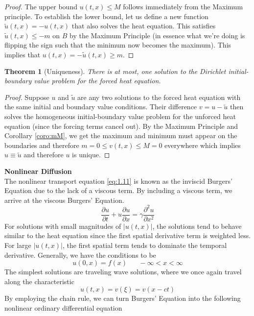 \documentclass{article}
\newcommand{\pd}[2]{\frac{\partial #1}{\partial #2}}
\newcommand{\pdt}[2]{\frac{\partial ^2 #1}{\partial #2 ^2}}
\newtheorem{theorem}{Theorem}[section]
\numberwithin{equation}{section}
\begin{document}
\begin{proof}
        The upper bound $u(t,x) \leq M$ follows immediately from the Maximum principle. To establish the lower bound, let us define a new function $\tilde{u}(t,x) = -u(t,x)$ that also solves the heat equation. This satisfies $\tilde{u}(t,x) \leq -m$ on $B$ by the Maximum Principle (in essence what we're doing is flipping the sign such that the minimum now becomes the maximum). This implies that $u(t,x) = -\tilde{u}(t,x) \geq m$.
    \end{proof}
\begin{theorem}[Uniqueness]
    There is at most, one solution to the Dirichlet initial-boundary value problem for the forced heat equation.
\end{theorem}
\begin{proof}
    Suppose $u$ and $\tilde{u}$ are any two solutions to the forced heat equation with the same initial and boundary value conditions. Their difference $v=u-\tilde{u}$ then solves the homogeneous initial-boundary value problem for the unforced heat equation (since the forcing terms cancel out). By the Maximum Principle and Corollary \ref{coro:mM}, we get the maximum and minimum must appear on the boundaries and therefore $m=0\leq v(t,x) \leq M=0$ everywhere which implies $u\equiv \tilde{u}$ and therefore $u$ is unique.
\end{proof}
\textbf{Nonlinear Diffusion} \\
The nonlinear transport equation \eqref{eq:1.11} is known as the inviscid Burgers' Equation due to the lack of a viscous term. By including a viscous term, we arrive at the viscous Burgers' Equation.
\begin{equation}
    \pd{u}{t}+u\pd{u}{x} = \gamma \pdt{u}{x}
\end{equation}
For solutions with small magnitudes of $|u(t,x)|$, the solutions tend to behave similar to the heat equation since the first spatial derivative term is weighted less. For large $|u(t,x)|$, the first spatial term tends to dominate the temporal derivative. Generally, we have the conditions to be 
\begin{equation*}
    u(0,x) = f(x) \hspace{20pt} -\infty<x<\infty
\end{equation*}
The simplest solutions are traveling wave solutions, where we once again travel along the characteristic 
\begin{equation*}
    u(t,x) = v(\xi) = v(x-ct)
\end{equation*}
By employing the chain rule, we can turn Burgers' Equation into the following nonlinear ordinary differential equation
\end{document}
